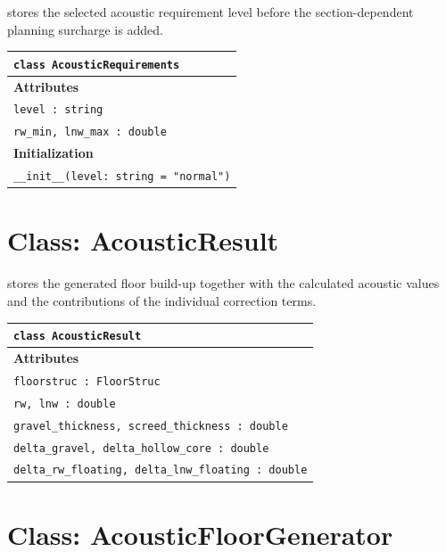 \documentclass[9pt,a4paper,twocolumn,twoside]{rho-class/rho}
\begin{document}
 stores the selected acoustic requirement level before the section-dependent planning surcharge is added.

\begin{table}[H]
    \begin{tabularx}{0.49\textwidth}{@{}X@{}}
    \hline
    \textbf{\texttt{class AcousticRequirements}} \\ \hline

    \textbf{Attributes} \\
    \texttt{level : string} \\
    \texttt{rw\_min, lnw\_max : double} \\ \hline

    \textbf{Initialization} \\
    \texttt{\_\_init\_\_(level: string = "normal")} \\ \hline
    \end{tabularx}
\end{table}

\section{Class: AcousticResult}

 stores the generated floor build-up together with the calculated acoustic values and the contributions of the individual correction terms.

\begin{table}[H]
    \begin{tabularx}{0.49\textwidth}{@{}X@{}}
    \hline
    \textbf{\texttt{class AcousticResult}} \\ \hline

    \textbf{Attributes} \\
    \texttt{floorstruc : FloorStruc} \\
    \texttt{rw, lnw : double} \\
    \texttt{gravel\_thickness, screed\_thickness : double} \\
    \texttt{delta\_gravel, delta\_hollow\_core : double} \\
    \texttt{delta\_rw\_floating, delta\_lnw\_floating : double} \\ \hline
    \end{tabularx}
\end{table}

\section{Class: AcousticFloorGenerator}
\end{document}
